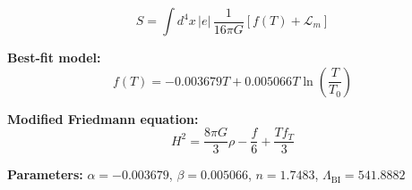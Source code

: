 
\begin{equation}
  S = \int d^4x \, |e| \, \frac{1}{16\pi G} \left[ f(T) + \mathcal{L}_m \right]
\end{equation}

\textbf{Best-fit model:}
\begin{equation}
  f(T) = -0.003679 T + 0.005066 T \ln\!\left(\frac{T}{T_0}\right)
\end{equation}

\textbf{Modified Friedmann equation:}
\begin{equation}
  H^2 = \frac{8\pi G}{3} \rho - \frac{f}{6} + \frac{T f_T}{3}
\end{equation}

\textbf{Parameters:}
$\alpha = -0.003679$, \quad
$\beta = 0.005066$, \quad
$n = 1.7483$, \quad
$\Lambda_{\text{BI}} = 541.8882$